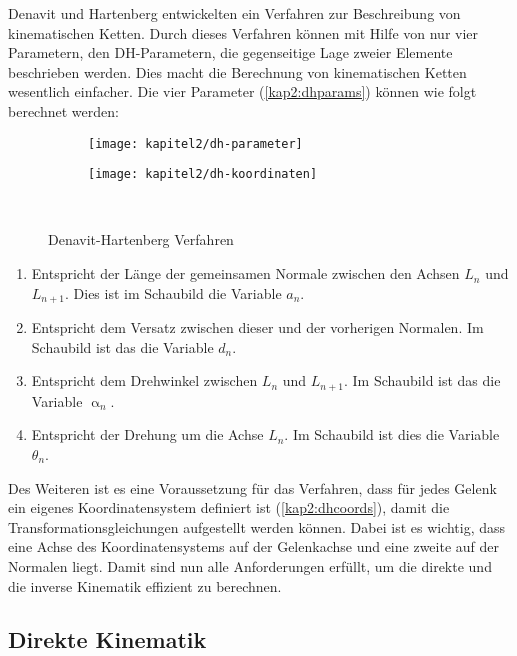 Denavit und Hartenberg entwickelten ein Verfahren zur Beschreibung von kinematischen Ketten. Durch dieses Verfahren können mit Hilfe von nur vier Parametern, den DH-Parametern, die gegenseitige Lage zweier Elemente beschrieben werden. Dies macht die Berechnung von kinematischen Ketten wesentlich einfacher. Die vier Parameter (\autoref{kap2:dhparams}) können wie folgt berechnet werden:

\begin{figure}[t!]
  \centering
  \begin{subfigure}[b]{.4\linewidth}
    \centering
    \texttt{[image: kapitel2/dh-parameter]}
    \label{kap2:dhparams}
  \end{subfigure}%
  \qquad
  \begin{subfigure}[b]{.4\linewidth}
    \centering
    \texttt{[image: kapitel2/dh-koordinaten]}
    \label{kap2:dhcoords}
  \end{subfigure}\\
  \caption{Denavit-Hartenberg Verfahren}
  \label{kap2lauron}
\end{figure}

\begin{enumerate}
  \item Entspricht der Länge der gemeinsamen Normale zwischen den Achsen $L_n$ und $L_{n+1}$. Dies ist im Schaubild die Variable $a_n$.
  \item Entspricht dem Versatz zwischen dieser und der vorherigen Normalen. Im Schaubild ist das die Variable $d_n$.
  \item Entspricht dem Drehwinkel zwischen $L_n$ und $L_{n+1}$. Im Schaubild ist das die Variable $\upalpha_n$.
  \item Entspricht der Drehung um die Achse $L_n$. Im Schaubild ist dies die Variable $\theta_n$.
\end{enumerate} 

Des Weiteren ist es eine Voraussetzung für das Verfahren, dass für jedes Gelenk ein eigenes Koordinatensystem definiert ist (\autoref{kap2:dhcoords}), damit die Transformationsgleichungen aufgestellt werden können. Dabei ist es wichtig, dass eine Achse des Koordinatensystems auf der Gelenkachse und eine zweite auf der Normalen liegt. Damit sind nun alle Anforderungen erfüllt, um die direkte und die inverse Kinematik effizient zu berechnen.

\subsection{Direkte Kinematik}


